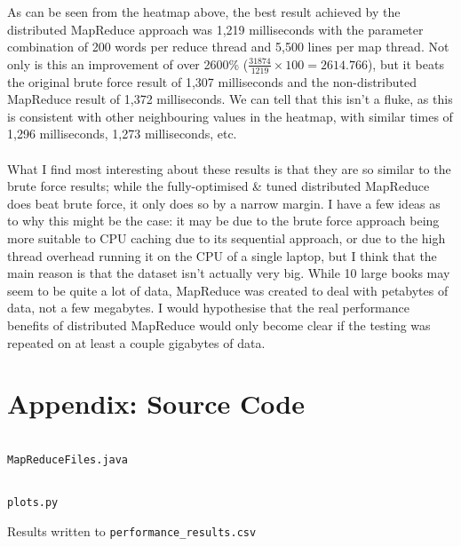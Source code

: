 \documentclass[a4paper]{article}
\newenvironment{code}{\captionsetup{type=listing}}{}
\begin{document}
As can be seen from the heatmap above, the best result achieved by the distributed MapReduce approach was 1,219 milliseconds with the parameter combination of 200 words per reduce thread and 5,500 lines per map thread.
Not only is this an improvement of over 2600\% ($\frac{31874}{1219} \times 100 = 2614.766$), but it beats the original brute force result of 1,307 milliseconds and the non-distributed MapReduce result of 1,372 milliseconds.
We can tell that this isn't a fluke, as this is consistent with other neighbouring values in the heatmap, with similar times of 1,296 milliseconds, 1,273 milliseconds, etc.
\\\\
What I find most interesting about these results is that they are so similar to the brute force results; while the fully-optimised \& tuned distributed MapReduce does beat brute force, it only does so by a narrow margin.
I have a few ideas as to why this might be the case:
it may be due to the brute force approach being more suitable to CPU caching due to its sequential approach, or due to the high thread overhead running it on the CPU of a single laptop, but I think that the main reason is that the dataset isn't actually very big.
While 10 large books may seem to be quite a lot of data, MapReduce was created to deal with petabytes of data, not a few megabytes.
I would hypothesise that the real performance benefits of distributed MapReduce would only become clear if the testing was repeated on at least a couple gigabytes of data.

\section{Appendix: Source Code}
\begin{code}
    \inputminted[linenos, breaklines, frame=single]{java}{../code/MapReduceFiles.java}
    \caption{\texttt{MapReduceFiles.java}}
\end{code}

\begin{code}
    \inputminted[linenos, breaklines, frame=single]{python}{../code/plots.py}
    \caption{\texttt{plots.py}}
\end{code}

\begin{table}[H]
\centering
{}
\caption{Results written to \texttt{performance\_results.csv}}
\end{table}
\end{document}
